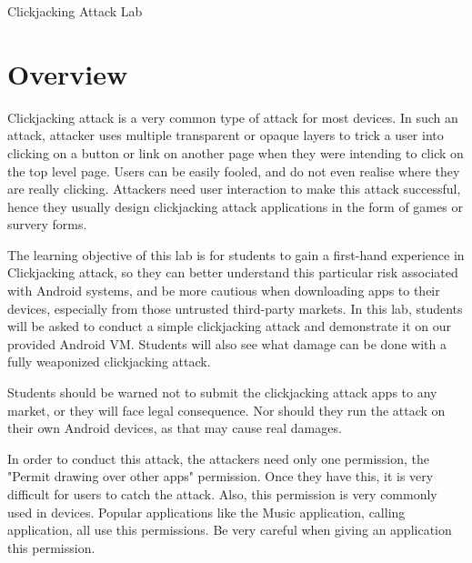 


\newcommand{\clickFigs}{./Figs}





\begin{center}
{\LARGE Clickjacking Attack Lab}
\end{center}




\section{Overview}


Clickjacking attack is a very common type of attack for most devices.
In such an attack, attacker uses multiple transparent or opaque 
layers to trick a user into clicking on a button or link on another page when they 
were intending to click on the top level page. Users can be easily fooled, and do not
even realise where they are really clicking. Attackers need user interaction to make this attack 
successful, hence they usually design clickjacking attack applications in the form of games or 
survery forms.

The learning objective of this lab is for students to gain a first-hand
experience in Clickjacking attack, so they can better understand 
this particular risk associated with Android systems, and be more cautious
when downloading apps to their devices, especially from those untrusted
third-party markets. In this lab, students will be asked to conduct a simple 
clickjacking attack and demonstrate it on our provided Android VM. Students will also see 
what damage can be done with a fully weaponized clickjacking attack. 

Students should be warned not to submit the clickjacking attack apps to any market, 
or they will face legal consequence. Nor should they run the attack on their own Android devices,
as that may cause real damages.

In order to conduct this attack, the attackers need only one permission, the "Permit drawing over other apps" permission.
Once they have this, it is very difficult for users to catch the attack. Also, this permission is very commonly used in devices. 
Popular applications like the Music application, calling application, all use this permissions. Be very careful when giving an 
application this permission.

